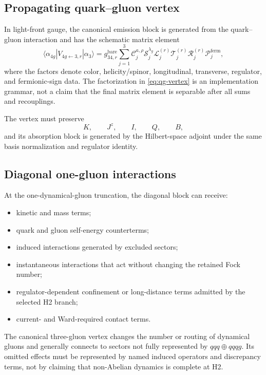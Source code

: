 \documentclass[11pt]{article}
\newcommand{\cR}{\mathcal R}
\newcommand{\cS}{\mathcal S}
\newcommand{\cT}{\mathcal T}
\newcommand{\cP}{\mathcal P}
\newcommand{\cC}{\mathcal C}
\newcommand{\cL}{\mathcal L}
\newcommand{\bare}{\mathrm{bare}}
\newcommand{\Jz}{J^z}
\begin{document}
\subsection{Propagating quark--gluon vertex}

In light-front gauge, the canonical emission block is generated from the
quark--gluon interaction and has the schematic matrix element
\begin{equation}
 \langle\alpha_{4g}|V_{4g\leftarrow3,r}|\alpha_3\rangle
 =
 g_{34,r}^{\bare}
 \sum_{j=1}^{3}
 \cC_{j}^{a,\rho}
 \cS_{j}^{\lambda_g}
 \cL_{j}^{(r)}
 \cT_{j}^{(r)}
 \cR_{j}^{(r)}
 \cP_{j}^{\mathrm{ferm}},
 \label{eq:qg-vertex}
\end{equation}
where the factors denote color, helicity/spinor, longitudinal, transverse,
regulator, and fermionic-sign data.  The factorization in
\cref{eq:qg-vertex} is an implementation grammar, not a claim that the final
matrix element is separable after all sums and recouplings.

The vertex must preserve
\begin{equation}
 K,
 \qquad
 \Jz,
 \qquad
 I,
 \qquad
 Q,
 \qquad
 B,
\end{equation}
and its absorption block is generated by the Hilbert-space adjoint under the
same basis normalization and regulator identity.

\subsection{Diagonal one-gluon interactions}

At the one-dynamical-gluon truncation, the diagonal block can receive:
\begin{itemize}
 \item kinetic and mass terms;
 \item quark and gluon self-energy counterterms;
 \item induced interactions generated by excluded sectors;
 \item instantaneous interactions that act without changing the retained
 Fock number;
 \item regulator-dependent confinement or long-distance terms admitted by the
 selected H2 branch;
 \item current- and Ward-required contact terms.
\end{itemize}
The canonical three-gluon vertex changes the number or routing of dynamical
gluons and generally connects to sectors not fully represented by
\(qqq\oplus qqqg\).  Its omitted effects must be represented by named induced
operators and discrepancy terms, not by claiming that non-Abelian dynamics is
complete at H2.
\end{document}
